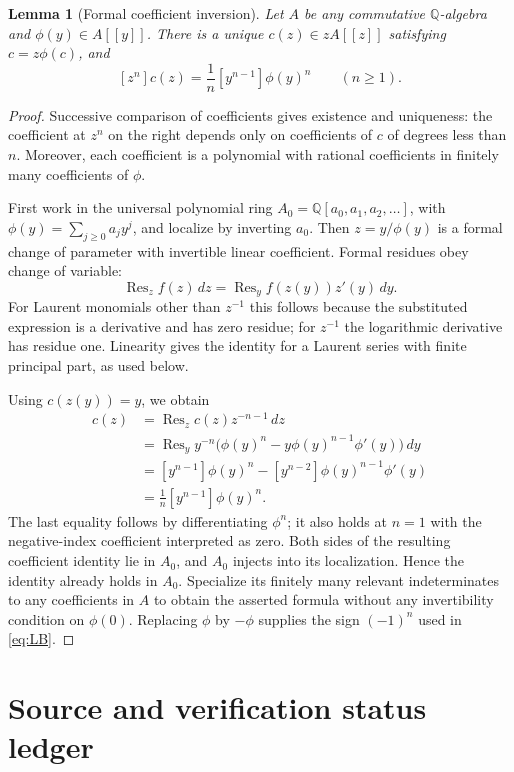 \documentclass[11pt,a4paper]{article}
\newtheorem{lemma}[theorem]{Lemma}
\theoremstyle{definition}
\theoremstyle{remark}
\newcommand{\Q}{\mathbb Q}
\newcommand{\Res}{\operatorname{Res}}
\begin{document}
\begin{lemma}[Formal coefficient inversion]\label{lem:ordinaryLB}
Let $A$ be any commutative $\Q$-algebra and $\phi(y)\in A[[y]]$.
There is a unique $c(z)\in zA[[z]]$ satisfying $c=z\phi(c)$, and
\[
 [z^n]c(z)=\frac1n[y^{n-1}]\phi(y)^n\qquad(n\ge1).
\]
\end{lemma}
\begin{proof}
Successive comparison of coefficients gives existence and uniqueness:
the coefficient at $z^n$ on the right depends only on coefficients of
$c$ of degrees less than $n$. Moreover, each coefficient is a polynomial
with rational coefficients in finitely many coefficients of $\phi$.

First work in the universal polynomial ring
$A_0=\Q[a_0,a_1,a_2,\ldots]$, with
$\phi(y)=\sum_{j\ge0}a_jy^j$, and localize by inverting $a_0$.
Then $z=y/\phi(y)$ is a formal change of parameter with invertible linear
coefficient. Formal residues obey change of variable:
\[
 \Res_z f(z)\,dz=\Res_y f(z(y))z'(y)\,dy.
\]
For Laurent monomials other than $z^{-1}$ this follows because the
substituted expression is a derivative and has zero residue; for
$z^{-1}$ the logarithmic derivative has residue one. Linearity gives the
identity for a Laurent series with finite principal part, as used below.

Using $c(z(y))=y$, we obtain
\begin{align*}
 [z^n]c(z)
 &=\Res_z c(z)z^{-n-1}\,dz\\
 &=\Res_y y^{-n}\bigl(\phi(y)^n-y\phi(y)^{n-1}\phi'(y)\bigr)\,dy\\
 &=[y^{n-1}]\phi(y)^n-[y^{n-2}]\phi(y)^{n-1}\phi'(y)\\
 &=\frac1n[y^{n-1}]\phi(y)^n.
\end{align*}
The last equality follows by differentiating $\phi^n$; it also holds at
$n=1$ with the negative-index coefficient interpreted as zero.
Both sides of the resulting coefficient identity lie in $A_0$, and
$A_0$ injects into its localization. Hence the identity already holds in
$A_0$. Specialize its finitely many relevant indeterminates to any
coefficients in $A$ to obtain the asserted formula without any invertibility
condition on $\phi(0)$. Replacing $\phi$ by $-\phi$ supplies the sign
$(-1)^n$ used in \eqref{eq:LB}.
\end{proof}

\section{Source and verification status ledger}
\label{app:ledger}
\end{document}
